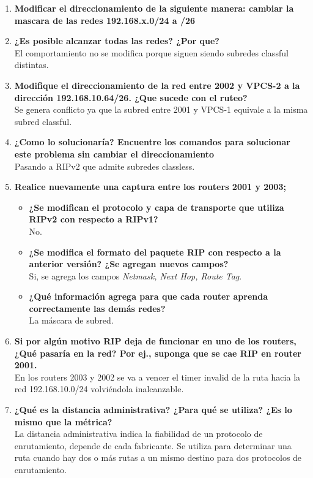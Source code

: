 \documentclass[letterpaper,12pt]{article}
\begin{document}
\begin{enumerate}
		\item \textbf{Modificar el direccionamiento de la siguiente manera: cambiar la mascara de las redes 192.168.x.0/24 a /26}
		\item \textbf{¿Es posible alcanzar todas las redes? ¿Por que?} \\
		El comportamiento no se modifica porque siguen siendo subredes classful distintas.
		\item \textbf{Modifique  el  direccionamiento  de  la  red  entre  2002  y  VPCS-2  a  la dirección 192.168.10.64/26. ¿Que sucede con el ruteo?} \\
		Se genera conflicto ya que la subred entre 2001 y VPCS-1 equivale a la misma subred classful.
		\item \textbf{¿Como lo solucionaría? Encuentre los comandos para solucionar este problema sin cambiar el direccionamiento} \\
		Pasando a RIPv2 que admite subredes classless.
		\item \textbf{Realice nuevamente una captura entre los routers 2001 y 2003;}
		\begin{itemize}
			\item \textbf{¿Se modifican el protocolo y capa de transporte que utiliza RIPv2 con respecto a RIPv1?} \\
			No.
			\item \textbf{¿Se modifica el formato del paquete RIP con respecto a la anterior versión? ¿Se agregan nuevos campos?} \\
			Si, se agrega los campos \textit{Netmask, Next Hop, Route Tag}.
			\item \textbf{¿Qué información agrega para que cada router aprenda correctamente las demás redes?} \\
			La máscara de subred.
		\end{itemize}
		\item \textbf{Si por algún motivo RIP deja de funcionar en uno de los routers, ¿Qué pasaría en la red? Por ej., suponga que se cae RIP en router 2001.} \\
		En los routers 2003 y 2002 se va a vencer el timer invalid de la ruta hacia la red 192.168.10.0/24 volviéndola inalcanzable. 
		\item \textbf{¿Qué es la distancia administrativa? ¿Para qué se utiliza? ¿Es lo mismo que la métrica?} \\
		La distancia administrativa indica la fiabilidad de un protocolo de enrutamiento, depende de cada fabricante. Se utiliza para determinar una ruta cuando hay dos o más rutas a un mismo destino para dos protocolos de enrutamiento. \\

\end{enumerate}
\end{document}
